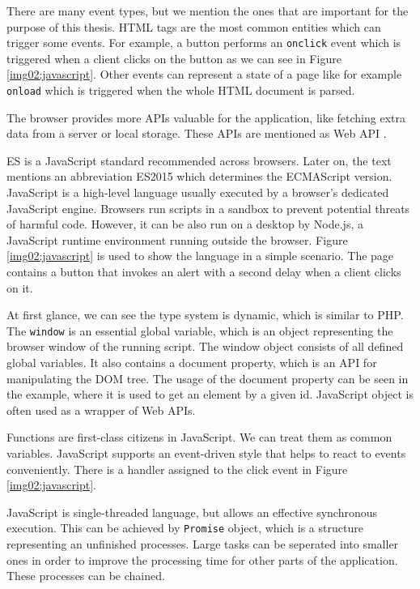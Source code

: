There are many event types, but we mention the ones that are important for the purpose of this thesis.
HTML tags are the most common entities which can trigger some events.
For example, a button performs an \texttt{onclick} event which is triggered when a client clicks on the button as we can see in Figure \ref{img02:javascript}. 
Other events can represent a state of a page like for example \texttt{onload} which is triggered when the whole HTML document is parsed.
\par
The browser provides more APIs valuable for the application, like fetching extra data from a server or local storage.
These APIs are mentioned as Web API \cite{online:webApi}.
\par
\ac{ES} is a JavaScript standard recommended across browsers.
Later on, the text mentions an abbreviation ES2015 which determines the ECMAScript version.
JavaScript is a high-level language usually executed by a browser's dedicated JavaScript engine.
Browsers run scripts in a sandbox to prevent potential threats of harmful code.
However, it can be also run on a desktop by Node.js, a JavaScript runtime environment running outside the browser.
Figure \ref{img02:javascript} is used to show the language in a simple scenario.
The page contains a button that invokes an alert with a second delay when a client clicks on it.
\par
At first glance, we can see the type system is dynamic, which is similar to PHP.
The \texttt{window} is an essential global variable, which is an object representing the browser window of the running script.
The window object consists of all defined global variables.
It also contains a document property, which is an API for manipulating the DOM tree.
The usage of the document property can be seen in the example, where it is used to get an element by a given id.
JavaScript object is often used as a wrapper of Web APIs.
\par
Functions are first-class citizens in JavaScript.
We can treat them as common variables.
JavaScript supports an event-driven style that helps to react to events conveniently.
There is a handler assigned to the click event in Figure \ref{img02:javascript}.
\par
JavaScript is single-threaded language, but allows an effective synchronous execution.
This can be achieved by \texttt{Promise} object, which is a structure representing an unfinished processes.
Large tasks can be seperated into smaller ones in order to improve the processing time for other parts of the application.
These processes can be chained.
